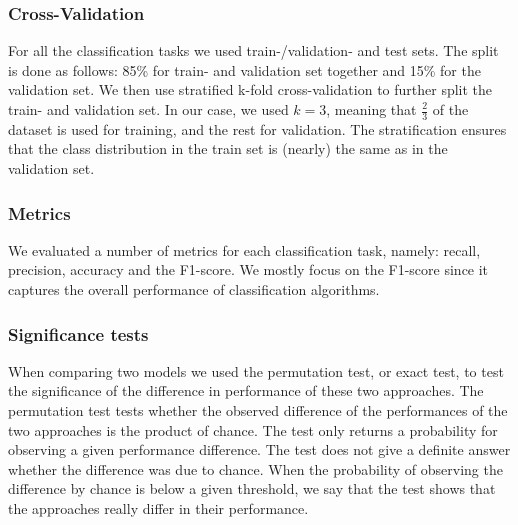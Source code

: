 
\subsubsection{Cross-Validation}
For all the classification tasks we used train-/validation- and test sets.
The split is done as follows: 85\% for train- and validation set together and 15\% for the validation set.
We then use stratified k-fold cross-validation to further split the train- and validation set. In our case, we used $k = 3$, meaning that $\frac{2}{3}$ of the dataset is used for training, and the rest for validation.
The stratification ensures that the class distribution in the train set is (nearly) the same as in the validation set.


\subsubsection{Metrics}
We evaluated a number of metrics for each classification task, namely: 
recall, precision, accuracy and the F1-score. We mostly focus on the F1-score since it captures the overall performance of classification algorithms.

\subsubsection{Significance tests}
When comparing two models we used the permutation test, or exact test, to test the significance of the difference in performance of these two approaches.
The permutation test tests whether the observed difference of the performances of the two approaches is the product of chance.
The test only returns a probability for observing a given performance difference. The test does not give a definite answer whether the difference was due to chance.
When the probability of observing the difference by chance is below a given threshold, we say that the test shows that the approaches really differ in their performance.


